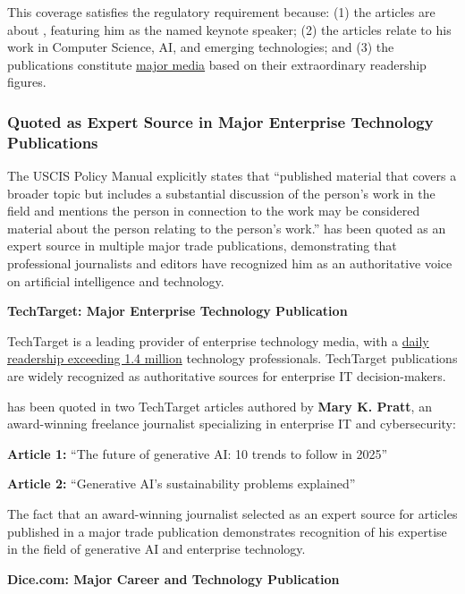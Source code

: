 This coverage satisfies the regulatory requirement because: (1) the articles are about \dr, featuring him as the named keynote speaker; (2) the articles relate to his work in Computer Science, AI, and emerging technologies; and (3) the publications constitute \underline{major media} based on their extraordinary readership figures.


\subsubsection{\dr Quoted as Expert Source in Major Enterprise Technology Publications}
\label{media:quotes}

The USCIS Policy Manual explicitly states that ``published material that covers a broader topic but includes a substantial discussion of the person's work in the field and mentions the person in connection to the work may be considered material about the person relating to the person's work.'' \dr has been quoted as an expert source in multiple major trade publications, demonstrating that professional journalists and editors have recognized him as an authoritative voice on artificial intelligence and technology.

\textbf{TechTarget: Major Enterprise Technology Publication}

TechTarget is a leading provider of enterprise technology media, with a \underline{daily readership exceeding 1.4 million} technology professionals. TechTarget publications are widely recognized as authoritative sources for enterprise IT decision-makers.

\dr has been quoted in two TechTarget articles authored by \textbf{Mary K. Pratt}, an award-winning freelance journalist specializing in enterprise IT and cybersecurity:

\textbf{Article 1:} ``The future of generative AI: 10 trends to follow in 2025'' \cite{PM9}

\textbf{Article 2:} ``Generative AI's sustainability problems explained'' \cite{PM10}

The fact that an award-winning journalist selected \dr as an expert source for articles published in a major trade publication demonstrates recognition of his expertise in the field of generative AI and enterprise technology.

\textbf{Dice.com: Major Career and Technology Publication}

